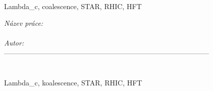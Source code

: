  \\
\noindent  Lambda\_c, coalescence, STAR, RHIC, HFT

%
 \newpage
 \noindent
{\it N\' azev pr\' ace:}\\
{\bf \czechtitle}\\

\noindent
{\it Autor:} \myself\\
--------------------------------------------------------------------------------------- \\


 \\

 \\
Lambda\_c, koalescence, STAR, RHIC, HFT


%
